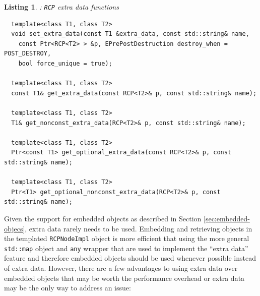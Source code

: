 \documentclass[pdf,ps2pdf,11pt]{SANDreport}
\newtheorem{listing}{Listing}
\begin{document}
\begin{listing}:  {}\texttt{RCP} extra data functions \\
\label{listing:RCP-extra-data}
{\small\begin{verbatim}
  template<class T1, class T2>
  void set_extra_data(const T1 &extra_data, const std::string& name,
    const Ptr<RCP<T2> > &p, EPrePostDestruction destroy_when = POST_DESTROY,
    bool force_unique = true);
  
  template<class T1, class T2> 
  const T1& get_extra_data(const RCP<T2>& p, const std::string& name);
  
  template<class T1, class T2>
  T1& get_nonconst_extra_data(RCP<T2>& p, const std::string& name);
  
  template<class T1, class T2>
  Ptr<const T1> get_optional_extra_data(const RCP<T2>& p, const std::string& name);
  
  template<class T1, class T2>
  Ptr<T1> get_optional_nonconst_extra_data(RCP<T2>& p, const std::string& name);
\end{verbatim}}
\end{listing}

Given the support for embedded objects as described in Section
{}\ref{sec:embedded-objecs}, extra data rarely needs to be used.
Embedding and retrieving objects in the templated
{}\texttt{RCPNodeImpl} object is more efficient that using the more
general {}\texttt{std::map} object and {}\texttt{any} wrapper that are
used to implement the ``extra data'' feature and therefore embedded
objects should be used whenever possible instead of extra data.
However, there are a few advantages to using extra data over embedded
objects that may be worth the performance overhead or extra data may
be the only way to address an issue:
\end{document}
